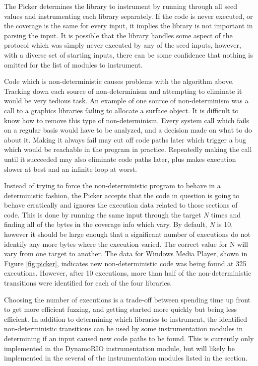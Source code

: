 The Picker determines the library to instrument by running through all seed values and instrumenting each
library separately. If the code is never executed, or the coverage is the
same for every input, it implies the library is not important in parsing the
input.  It is possible that the library handles some aspect of the
protocol which was simply never executed by any of the seed inputs, however,
with a diverse set of starting inputs, there can be some confidence that
nothing is omitted for the list of modules to instrument.

Code which is non-deterministic causes problems with the algorithm above.
Tracking down each source of non-determinism and attempting to eliminate it
would be very tedious task. An example of one source of non-determinism was a
call to a graphics libraries failing to allocate a surface object. It is
difficult to know how to remove this type of non-determinism. Every system call
which fails on a regular basis would have to be analyzed, and a decision made
on what to do about it.  Making it always fail may cut off code paths later
which trigger a bug which would be reachable in the program in practice.
Repeatedly making the call until it succeeded may also eliminate code paths
later, plus makes execution slower at best and an infinite loop at worst.

Instead of trying to force the non-deterministic program to behave in a
deterministic fashion, the Picker accepts that the code in question is
going to behave erratically and ignores the execution data related to those
sections of code.  This is done by running the same input through the target
\textit{N} times and finding all of the bytes in the coverage info which
vary. By default, \textit{N} is 10, however it should be large enough that a
significant number of executions do not identify any more bytes where the
execution varied. The correct value for N will vary from one target to another.
The data for Windows Media Player, shown in Figure \ref{fig:picker}, indicates
new non-deterministic code was being found at 325 executions. However, after
10 executions, more than half of the non-deterministic transitions were
identified for each of the four libraries.

Choosing the number of executions is a trade-off between spending time up front
to get more efficient fuzzing, and getting started more quickly but being less
efficient.  In addition to determining which libraries to instrument, the
identified non-deterministic transitions can be used by some instrumentation
modules in determining if an input caused new code paths to be found.  This is
currently only implemented in the DynamoRIO instrumentation module, but will
likely be implemented in the several of the instrumentation modules listed in
the  section.

